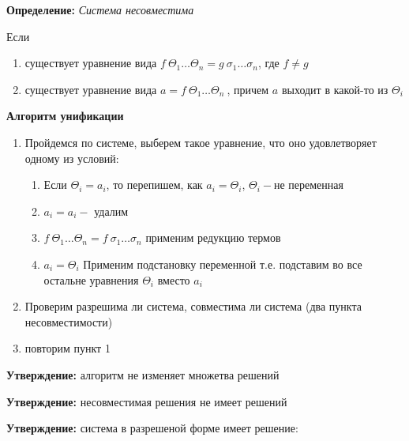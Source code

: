 \documentclass[12pt, a4paper]{article}
\begin{document}
		\textbf{Определение:} \textit{Система несовместима}\par
	Если 
		\begin{enumerate}
			\item существует уравнение вида $f\:\Theta_1\hdots\Theta_n=g\:\sigma_1\hdots\sigma_n$, где $f\neq g$
			\item существует уравнение вида $a=f\: \Theta_1\hdots\Theta_n\:$, причем $a$ выходит в какой-то из $\Theta_i$
		\end{enumerate}			
		\textbf{Алгоритм унификации}\par
		\begin{enumerate}
		\item Пройдемся по системе, выберем такое уравнение, что оно удовлетворяет одному из условий:\begin{enumerate}
			\item Если $\Theta_i=a_i$, то перепишем, как $a_i=\Theta_i$, $\Theta_i-$не переменная
			\item $a_i=a_i-$ удалим
			\item $f\:\Theta_1\hdots\Theta_n=f\:\sigma_1\hdots\sigma_n$  применим редукцию термов 
			\item $a_i=\Theta_i$ Применим подстановку переменной т.е. подставим во все остальне уравнения $\Theta_i$ вместо $a_i$
		\end{enumerate}
		\item Проверим разрешима ли система, совместима ли система (два пункта несовместимости)
		\item повторим пункт 1 		
		\end{enumerate}
		
		\textbf{Утверждение:} алгоритм не изменяет множетва решений\par 
		\textbf{Утверждение:} несовместимая решения не имеет решений\par
		\textbf{Утверждение:} система в разрешеной форме имеет решение:\par		
		
\end{document}
